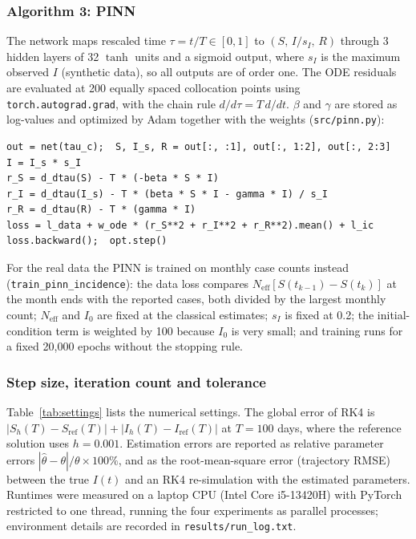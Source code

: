 \documentclass[12pt,a4paper]{article}
\newcommand{\Neff}{N_{\mathrm{eff}}}
\begin{document}
\subsubsection*{Algorithm 3: PINN}

The network maps rescaled time $\tau=t/T\in[0,1]$ to $(S,\,I/s_I,\,R)$ through 3 hidden layers of 32 $\tanh$ units and a sigmoid output, where $s_I$ is the maximum observed $I$ (synthetic data), so all outputs are of order one. The ODE residuals are evaluated at 200 equally spaced collocation points using \texttt{torch.autograd.grad}, with the chain rule $d/d\tau = T\,d/dt$. $\beta$ and $\gamma$ are stored as log-values and optimized by Adam together with the weights (\texttt{src/pinn.py}):
\begin{lstlisting}
out = net(tau_c);  S, I_s, R = out[:, :1], out[:, 1:2], out[:, 2:3]
I = I_s * s_I
r_S = d_dtau(S) - T * (-beta * S * I)
r_I = d_dtau(I_s) - T * (beta * S * I - gamma * I) / s_I
r_R = d_dtau(R) - T * (gamma * I)
loss = l_data + w_ode * (r_S**2 + r_I**2 + r_R**2).mean() + l_ic
loss.backward();  opt.step()
\end{lstlisting}

For the real data the PINN is trained on monthly case counts instead (\texttt{train\_pinn\_incidence}): the data loss compares $\Neff[S(t_{k-1})-S(t_k)]$ at the month ends with the reported cases, both divided by the largest monthly count; $\Neff$ and $I_0$ are fixed at the classical estimates; $s_I$ is fixed at 0.2; the initial-condition term is weighted by 100 because $I_0$ is very small; and training runs for a fixed 20,000 epochs without the stopping rule.

\subsubsection*{Step size, iteration count and tolerance}

Table~\ref{tab:settings} lists the numerical settings. The global error of RK4 is $|S_h(T)-S_{\mathrm{ref}}(T)|+|I_h(T)-I_{\mathrm{ref}}(T)|$ at $T=100$ days, where the reference solution uses $h=0.001$. Estimation errors are reported as relative parameter errors $|\hat\theta-\theta|/\theta\times100\%$, and as the root-mean-square error (trajectory RMSE) between the true $I(t)$ and an RK4 re-simulation with the estimated parameters. Runtimes were measured on a laptop CPU (Intel Core i5-13420H) with PyTorch restricted to one thread, running the four experiments as parallel processes; environment details are recorded in \texttt{results/run\_log.txt}.
\end{document}
